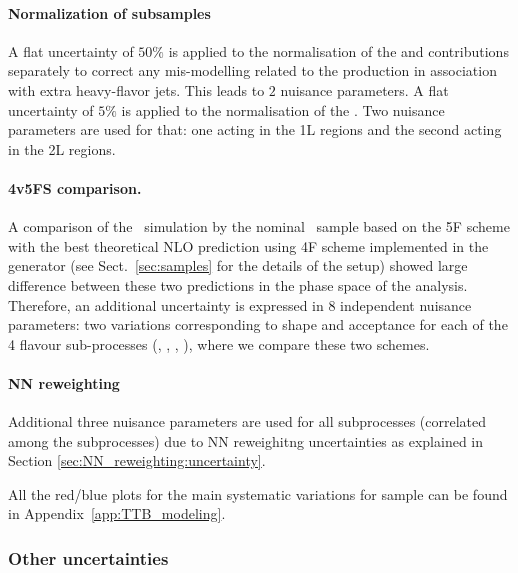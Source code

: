 \paragraph{Normalization of \ttbar subsamples} A flat uncertainty of $50\%$ is applied to the normalisation of the \ttbin and \ttcin contributions separately to correct any mis-modelling related to the \ttbar production in association with extra heavy-flavor jets. This leads to $2$ nuisance parameters. A flat uncertainty of $5\%$ is applied to the normalisation of the \ttl. Two nuisance parameters are used for that: one acting in the 1L regions and the second acting in the 2L regions.

\paragraph{4v5FS comparison.} A comparison of the \ttbin\ simulation by the nominal \ttbar\ sample based on the 5F scheme with the best theoretical NLO prediction using 4F scheme implemented in the \powhegboxRes generator (see Sect.~\ref{sec:samples} for the details of the setup) showed large difference between these two predictions in the phase space of the analysis. Therefore, an additional uncertainty is expressed in 8 independent nuisance parameters: two variations corresponding to shape and acceptance for each of the 4 flavour sub-processes (\ttbb, \ttB, \ttb, \ttbbb), where we compare these two schemes.

\paragraph{NN reweighting} Additional three nuisance parameters are used for all \ttbar subprocesses (correlated among the subprocesses) due to NN reweighitng uncertainties as explained in Section \ref{sec:NN_reweighting:uncertainty}.

All the red/blue plots for the main systematic variations for sample \ttbin can be found in Appendix~\ref{app:TTB_modeling}.


\subsubsection{Other uncertainties}

